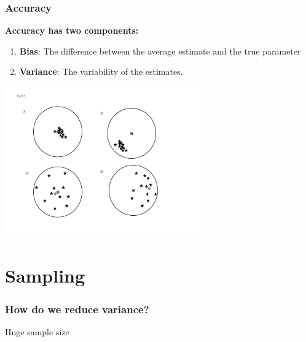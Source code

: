 \documentclass[color=usenames,dvipsnames]{beamer}\usepackage[]{graphicx}\usepackage[]{color}
\begin{document}
\begin{frame}
  \frametitle{Accuracy}
  {\bf \large Accuracy has two components: \par}
  \begin{enumerate}[\bf (1)]
    \normalsize
    \item {\bf Bias}: The difference between the average estimate and
      the true parameter \par
    \item {\bf Variance}: The variability of the estimates.
  \end{enumerate}
  \pause
  \centering
  \includegraphics[width=0.65\textwidth]{figs/bulls-eye.jpg} \\
\end{frame}






\section{Sampling}



\begin{frame}
  \frametitle{How do we reduce variance?}
  \pause
  \begin{center}
    \Huge Huge sample size
  \end{center}
\end{frame}
\end{document}
